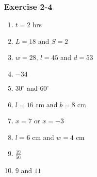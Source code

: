 {\begin{multicols}{3}
\begin{enumerate}[noitemsep, label=\textbf{\arabic*}. ]
\begin{enumerate}[noitemsep, label=\textbf{(\alph*)} ]
\end{enumerate}
\end{enumerate}



\subsubsection*{Exercise 2-4} %

\begin{enumerate}[noitemsep, label=\textbf{\arabic*}. ] 
\item$t = 2$ hrs %
\item $L = 18$ and $S = 2$%
\item $w=28$, $l=45$ and $d=53$%
\item $-34$%
\item$30^{\circ}$ and $60^{\circ}$  %
\item $l=16$ cm and $b=8$ cm%
\item $x = 7$ or $x = -3$%
\item $l = 6$ cm and $w = 4$ cm %
\item$\frac{19}{50}$ %
\item $9$ and $11$ %

\end{enumerate}
\end{multicols}}
